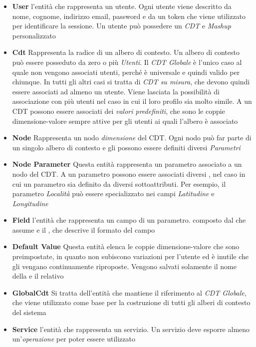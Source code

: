 \begin{itemize}
	\item \textbf{User}
	\upe l'entità che rappresenta un utente. Ogni utente viene descritto da nome, cognome, indirizzo email, password e da un token che viene utilizzato per identificare la sessione. Un utente può possedere un \emph{CDT} e \emph{Mashup} personalizzato
	\item \textbf{Cdt}
	Rappresenta la radice di un albero di contesto. Un albero di contesto può essere posseduto da zero o più \emph{Utenti}. Il \emph{CDT Globale} è l'unico caso al quale non vengono associati utenti, perché è universale e quindi valido per chiunque. In tutti gli altri casi si tratta di \emph{CDT su misura}, che devono quindi essere associati ad almeno un utente. Viene lasciata la possibilità di associazione con più utenti nel caso in cui il loro profilo sia molto simile. A un CDT possono essere associati dei \emph{valori predefiniti}, che sono le coppie dimensione-valore sempre attive per gli utenti ai quali l'albero è associato
	\item \textbf{Node}
	Rappresenta un nodo \emph{dimensione} del CDT. Ogni nodo può far parte di un singolo albero di contesto e gli possono essere definiti diversi \emph{Parametri}
	\item \textbf{Node Parameter}
	Questa entità rappresenta un parametro associato a un nodo del CDT. A un parametro possono essere associati diversi , nel caso in cui un parametro sia definito da diversi sottoattributi. Per esempio, il parametro \emph{Località} può essere specializzato nei campi \emph{Latitudine} e \emph{Longitudine}
	\item \textbf{Field}
	\upe l'entità che rappresenta un campo di un parametro. \upe composto dal  che assume e il , che descrive il formato del campo
	\item \textbf{Default Value}
	Questa entità elenca le coppie dimensione-valore che sono preimpostate, in quanto non subiscono variazioni per l'utente ed è inutile che gli vengano continuamente riproposte. Vengono salvati solamente il nome della  e il relativo 
	\item \textbf{GlobalCdt}
	Si tratta dell'entità che mantiene il riferimento al \emph{CDT Globale}, che viene utilizzato come base per la costruzione di tutti gli alberi di contesto del sistema
	\item \textbf{Service}
	\upe l'entità che rappresenta un servizio. Un servizio deve esporre almeno un'\emph{operazione} per poter essere utilizzato

\end{itemize}
